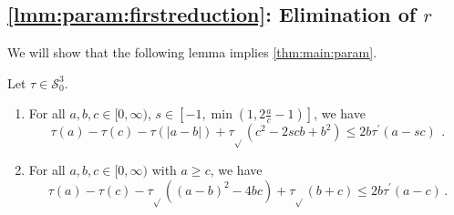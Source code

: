 \documentclass{article}
\newcommand{\abs}[1]{\left| #1 \right|} %
\newcommand*{\mc}[1]{\mathcal{#1}}
\newcommand{\Rp}{[0, \infty)} %
\newcommand{\pr}{^\prime}
\newcommand{\equationFullstop}{\, .}
\newcommand{\eqfs}{\equationFullstop}
\newcommand{\tran}{\tau}
\newcommand{\trans}{\tran_{\!\sqrt{}}}
\newcommand{\dtran}{\tran\pr}
\newcommand{\setccod}[1]{\mc S_0^{#1}}
\begin{document}
\begin{appendix}
\subsection{\cref{lmm:param:firstreduction}: Elimination of $r$}
%
We will show that the following lemma implies \cref{thm:main:param}.
%
\begin{lemma}[Elimination of $r$]\label{lmm:param:firstreduction}
	Let $\tran\in\setccod3$.
	\begin{enumerate}[label=(\roman*)]
		\item \label{lmm:param:firstreduction:a}
		For all $a,b,c\in\Rp$, $s\in [-1, \min(1, 2\frac ac -1)]$, we have
		\begin{equation}
			\tran(a) - \tran(c) -\tran(\abs{a-b}) + \trans(c^2 - 2scb + b^2) \leq 2b \dtran(a-sc)\
			\eqfs
		\end{equation}
		\item \label{lmm:param:firstreduction:b}
		For all $a,b,c\in\Rp$ with $a\geq c$, we have
		\begin{equation}
			\tran(a) - \tran(c) -\trans((a-b)^2 - 4bc) + \trans(b + c) \leq 2b \dtran(a-c)
			\eqfs
		\end{equation}
	\end{enumerate}
\end{lemma}
%
%
%

\end{appendix}
\end{document}
